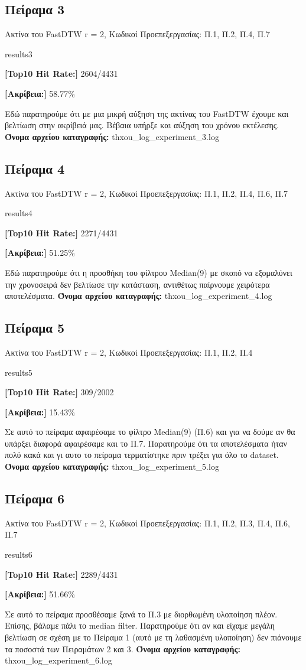 \subsection{Πείραμα 3}
Ακτίνα του FastDTW r = 2, Κωδικοί Προεπεξεργασίας: Π.1, Π.2, Π.4, Π.7
\begin{labeling}{results3}
  \item \textbf{[Top10 Hit Rate:]} 2604/4431
  \item \textbf{[Ακρίβεια:]} 58.77\%
\end{labeling}
Εδώ παρατηρούμε ότι με μια μικρή αύξηση της ακτίνας του FastDTW έχουμε και βελτίωση στην ακρίβειά μας.
Βέβαια υπήρξε και αύξηση του χρόνου εκτέλεσης.
\textbf{Όνομα αρχείου καταγραφής:} thxou\_log\_experiment\_3.log

\subsection{Πείραμα 4}
Ακτίνα του FastDTW r = 2, Κωδικοί Προεπεξεργασίας: Π.1, Π.2, Π.4, Π.6, Π.7
\begin{labeling}{results4}
  \item \textbf{[Top10 Hit Rate:]} 2271/4431
  \item \textbf{[Ακρίβεια:]} 51.25\%
\end{labeling}
Εδώ παρατηρούμε ότι η προσθήκη του φίλτρου Median(9) με σκοπό να εξομαλύνει την χρονοσειρά δεν βελτίωσε την κατάσταση, αντιθέτως παίρνουμε χειρότερα αποτελέσματα.
\textbf{Όνομα αρχείου καταγραφής:} thxou\_log\_experiment\_4.log

\subsection{Πείραμα 5}
Ακτίνα του FastDTW r = 2, Κωδικοί Προεπεξεργασίας: Π.1, Π.2, Π.4
\begin{labeling}{results5}
  \item \textbf{[Top10 Hit Rate:]} 309/2002
  \item \textbf{[Ακρίβεια:]} 15.43\%
\end{labeling}
Σε αυτό το πείραμα αφαιρέσαμε το φίλτρο Median(9) (Π.6) και για να δούμε αν θα υπάρξει διαφορά αφαιρέσαμε και το Π.7. Παρατηρούμε ότι τα αποτελέσματα ήταν πολύ κακά και γι αυτο το πείραμα τερματίστηκε πριν τρέξει για όλο το dataset.
\textbf{Όνομα αρχείου καταγραφής:} thxou\_log\_experiment\_5.log

\subsection{Πείραμα 6}
Ακτίνα του FastDTW r = 2, Κωδικοί Προεπεξεργασίας: Π.1, Π.2, Π.3, Π.4, Π.6, Π.7
\begin{labeling}{results6}
  \item \textbf{[Top10 Hit Rate:]} 2289/4431
  \item \textbf{[Ακρίβεια:]} 51.66\%
\end{labeling}
Σε αυτό το πείραμα προσθέσαμε ξανά το Π.3 με διορθωμένη υλοποίηση πλέον. Επίσης, βάλαμε πάλι το median filter. Παρατηρούμε ότι αν και είχαμε μεγάλη βελτίωση σε σχέση με το Πείραμα 1 (αυτό με τη λαθασμένη υλοποίηση) δεν πιάνουμε τα ποσοστά των Πειραμάτων 2 και 3.
\textbf{Όνομα αρχείου καταγραφής:} thxou\_log\_experiment\_6.log


